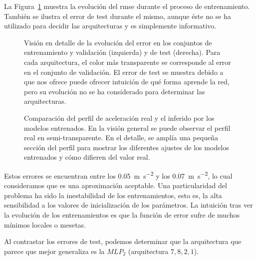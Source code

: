 La Figura~\ref{fig:lm-mlp-rmse-all-comparisons} muestra la evolución del \gls{rmse} durante el proceso de entrenamiento. También se ilustra el error de test durante el mismo, aunque éste no se ha utilizado para decidir las arquitecturas y es simplemente informativo.

\begin{figure}
	\centering
	\qquad
	\caption[Evolución del error durante el entrenamiento en las arquitecturas de \acrshort{mlp} para el modelo longitudinal]{Visión en detalle de la evolución del error en los conjuntos de entrenamiento y validación (izquierda) y de test (derecha). Para cada arquitectura, el color más transparente se corresponde al error en el conjunto de validación. El error de test se muestra debido a que nos ofrece puede ofrecer intuición de qué forma aprende la red, pero su evolución no se ha considerado para determinar las arquitecturas.}
	\label{fig:lm-mlp-rmse-all-comparisons}
\end{figure}

\begin{figure}[!b]
	\centering
	\qquad
	\caption[Comparación del perfil de aceleración real y el inferido por los modelos entrenados]{Comparación del perfil de aceleración real y el inferido por los modelos entrenados. En la visión general se puede observar el perfil real en semi-transparente. En el detalle, se amplía una pequeña sección del perfil para mostrar los diferentes ajustes de los modelos entrenados y cómo difieren del valor real.}
	\label{fig:cf-mlp-test-comparisons}
\end{figure}

Estos errores se encuentran entre los \SI{0.05}{\metre\per\square\second} y los \SI{0.07}{\metre\per\square\second}, lo cual consideramos que es una aproximación aceptable. Una particularidad del problema ha sido la inestabilidad de los entrenamientos, esto es, la alta sensibilidad a los valores de inicialización de los parámetros. La intuición tras ver la evolución de los entrenamientos es que la función de error sufre de muchos mínimos locales o mesetas.

Al contrastar los errores de test, podemos determinar que la arquitectura que parece que mejor generaliza es la $MLP_2$ (arquitectura $7, 8, 2, 1$).

